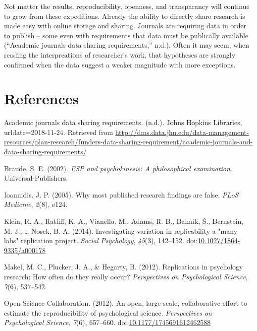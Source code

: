\documentclass[man]{apa6}
\theoremstyle{definition}
\theoremstyle{definition}
\theoremstyle{definition}
\theoremstyle{remark}
\begin{document}
Not matter the results, reproducibility, openness, and transparancy will
continue to grow from these expeditions. Already the ability to directly
share research is made easy with online storage and sharing. Journals
are requiring data in order to publish -- some even with requirements
that data must be publically available (``Academic journals data sharing
requirements,'' n.d.). Often it may seem, when reading the
interpreations of researcher's work, that hypotheses are strongly
confirmed when the data suggest a weaker magnitude with more exceptions.

\newpage

\hypertarget{references}{%
\section{References}\label{references}}

\begingroup
\setlength{\parindent}{-0.5in}
\setlength{\leftskip}{0.5in}

\hypertarget{refs}{}
\leavevmode\hypertarget{ref-jhl2018academic}{}%
Academic journals data sharing requirements. (n.d.). Johns Hopkins
Libraries, urldate=2018-11-24. Retrieved from
\url{http://dms.data.jhu.edu/data-management-resources/plan-research/funders-data-sharing-requirement/academic-journals-and-data-sharing-requirements/}

\leavevmode\hypertarget{ref-braude2002esp}{}%
Braude, S. E. (2002). \emph{ESP and psychokinesis: A philosophical
examination}. Universal-Publishers.

\leavevmode\hypertarget{ref-ioannidis2005why}{}%
Ioannidis, J. P. (2005). Why most published research findings are false.
\emph{PLoS Medicine}, \emph{2}(8), e124.

\leavevmode\hypertarget{ref-klein2014investigating}{}%
Klein, R. A., Ratliff, K. A., Vianello, M., Adams, R. B., Bahník, Š.,
Bernstein, M. J., \ldots{} Nosek, B. A. (2014). Investigating variation
in replicability a "many labs" replication project. \emph{Social
Psychology}, \emph{45}(3), 142--152.
doi:\href{https://doi.org/10.1027/1864-9335/a000178}{10.1027/1864-9335/a000178}

\leavevmode\hypertarget{ref-makel2012replications}{}%
Makel, M. C., Plucker, J. A., \& Hegarty, B. (2012). Replications in
psychology research: How often do they really occur? \emph{Perspectives
on Psychological Science}, \emph{7}(6), 537--542.

\leavevmode\hypertarget{ref-open2012open}{}%
Open Science Collaboration. (2012). An open, large-scale, collaborative
effort to estimate the reproducibility of psychological science.
\emph{Perspectives on Psychological Science}, \emph{7}(6), 657--660.
doi:\href{https://doi.org/10.1177/1745691612462588}{10.1177/1745691612462588}
\end{document}
